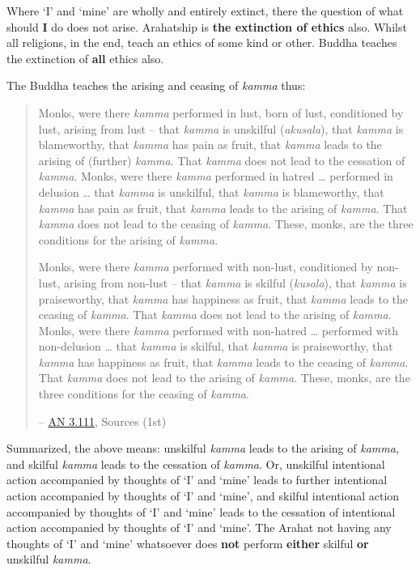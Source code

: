 Where `I' and `mine' are wholly and entirely extinct, there the question of what should \textbf{I} do does not arise. Arahatship is \textbf{the extinction of ethics} also. Whilst all religions, in the end, teach an ethics of some kind or other. Buddha teaches the extinction of \textbf{all} ethics also.

The Buddha teaches the arising and ceasing of \emph{kamma} thus:

\begin{quote}
Monks, were there \emph{kamma} performed in lust, born of lust, conditioned by lust, arising from lust -- that \emph{kamma} is unskilful (\emph{akusala}), that \emph{kamma} is blameworthy, that \emph{kamma} has pain as fruit, that \emph{kamma} leads to the arising of (further) \emph{kamma}. That \emph{kamma} does not lead to the cessation of \emph{kamma}. Monks, were there \emph{kamma} performed in hatred \ldots{} performed in delusion \ldots{} that \emph{kamma} is unskilful, that \emph{kamma} is blameworthy, that \emph{kamma} has pain as fruit, that \emph{kamma} leads to the arising of \emph{kamma}. That \emph{kamma} does not lead to the ceasing of \emph{kamma}. These, monks, are the three conditions for the arising of \emph{kamma}.

Monks, were there \emph{kamma} performed with non-lust, conditioned by non-lust, arising from non-lust -- that \emph{kamma} is skilful (\emph{kusala}), that \emph{kamma} is praiseworthy, that \emph{kamma} has happiness as fruit, that \emph{kamma} leads to the ceasing of \emph{kamma}. That \emph{kamma} does not lead to the arising of \emph{kamma}. Monks, were there \emph{kamma} performed with non-hatred \ldots{} performed with non-delusion \ldots{} that \emph{kamma} is skilful, that \emph{kamma} is praiseworthy, that \emph{kamma} has happiness as fruit, that \emph{kamma} leads to the ceasing of \emph{kamma}. That \emph{kamma} does not lead to the arising of \emph{kamma}. These, monks, are the three conditions for the ceasing of \emph{kamma}.

 -- \href{https://suttacentral.net/an3.111/en/sujato}{AN 3.111}, Sources (1st)
\end{quote}

Summarized, the above means: unskilful \emph{kamma} leads to the arising of \emph{kamma}, and skilful \emph{kamma} leads to the cessation of \emph{kamma}. Or, unskilful intentional action accompanied by thoughts of `I' and `mine' leads to further intentional action accompanied by thoughts of `I' and `mine', and skilful intentional action accompanied by thoughts of `I' and `mine' leads to the cessation of intentional action accompanied by thoughts of `I' and `mine'. The Arahat not having any thoughts of `I' and `mine' whatsoever does \textbf{not} perform \textbf{either} skilful \textbf{or} unskilful \emph{kamma}.

